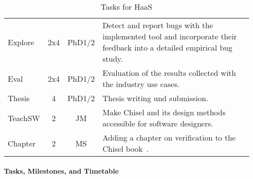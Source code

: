 \documentclass[fleqn,12pt]{article}
\begin{document}
\begin{table*}
{\begin{center}
\begin{tabular}{lccp{110mm}l}
      \midrule
      Explore                & 2x4 & PhD1/2    & Detect and report bugs with the implemented tool and incorporate their feedback into a detailed
      empirical bug study.                                                                                                                      \\
      Eval                   & 2x4 & PhD1/2    & Evaluation of the results collected with the industry use cases.                                                     \\
      Thesis                 & 4   & PhD1/2    & Thesis writing und submission.                                                                \\
      \midrule
      TeachSW                 &  2  & JM            & Make Chisel and its design methods accessible for software designers. \\
      Chapter                & 2   & MS        & Adding a chapter on verification to the Chisel book~\cite{chisel:book}.                       \\
      \bottomrule
    \end{tabular}
  \end{center}
  \caption{Tasks for HaaS}\label{tab:packages}
}
\end{table*}





\paragraph*{Tasks, Milestones, and Timetable}
\end{document}
